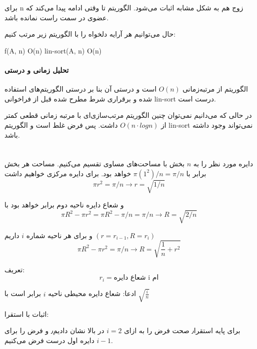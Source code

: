 برای n زوج هم به شکل مشابه اثبات می‌شود.
الگوریتم تا وقتی ادامه پیدا می‌کند که عضوی در سمت راست نمانده باشد.


حال می‌توانیم هر آرایه دلخواه را با الگوریتم زیر مرتب کنیم:
\begin{latin}
\begin{codebox}
	\li f(A, n)	\Comment O(n)
	\li lin-sort(A, n) \Comment O(n)
\end{codebox}
\end{latin}

\paragraph{تحلیل زمانی و درستی}
الگوریتم از مرتبه‌زمانی 
$O(n)$ 
است و درستی آن بنا بر درستی الگوریتم‌های استفاده شده و برقراری شرط مطرح شده قبل از فراخوانی lin-sort درست است.

در حالی که می‌دانیم نمی‌توان چنین الگوریتم مرتب‌سازی‌ای با مرتبه زمانی قطعی کمتر از 
$O(n\cdot logn)$
داشت. 
پس فرض غلط است و الگوریتم 
lin-sort
نمی‌تواند وجود داشته باشد.

\newpage
\usetikzlibrary{positioning, decorations.text}
\section{}
دایره مورد نظر را به $n$ بخش با مساحت‌های مساوی تقسیم می‌کنیم.
مساحت هر بخش برابر با 
$ \pi (1^2)/n = \pi / n $
خواهد بود.
برای دایره مرکزی خواهیم داشت
\begin{equation}
	\pi r^2 = \pi / n \rightarrow r = \sqrt{1/n}
\end{equation}

و شعاع دایره ناحیه دوم برابر خواهد بود با
\begin{equation}
	\pi R^2 - \pi r^2 = \pi R^2 - \pi / n = \pi / n \rightarrow R = \sqrt{2/n}
\end{equation}

و برای هر ناحیه شماره $i$ داریم
$(r = r_{i-1}, R = r_i)$
\begin{equation}
	\pi R^2 - \pi r^2 = \pi / n \rightarrow R = \sqrt{\frac{1}{n} + r^2}
\end{equation}

تعریف:
$$r_i = \text{شعاع دایره i ام}$$

ادعا:
شعاع دایره محیطی ناحیه $i$ 
برابر است با 
$\sqrt{\frac{i}{n}}$

اثبات با استقرا:

برای پایه استقرا٫ صحت فرض را به ازای $i =2$ در بالا نشان دادیم٫
و فرض را برای 
$i-1$
دایره اول درست فرض می‌کنیم.

